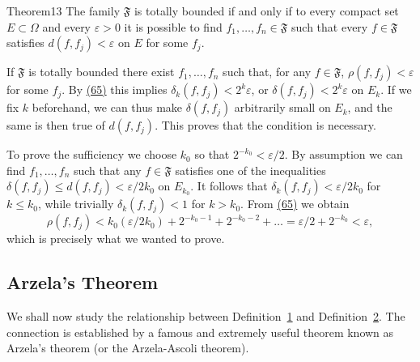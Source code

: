 \begin{originalstatement}{Theorem}{13}\label{thm:5.13}
The family $\mathfrak{F}$ is totally bounded if and only if to every compact set $E\subset\Omega$ and every $\varepsilon>0$ it is possible to find $f_{1},\ldots,f_{n}\in\mathfrak{F}$ such that every $f\in\mathfrak{F}$ satisfies $d(f,f_{j})<\varepsilon$ on $E$ for some $f_{j}$.
\end{originalstatement}
If $\mathfrak{F}$ is totally bounded there exist $f_{1},\ldots ,f_{n}$ such that, for any $f\in \mathfrak{F}$, $\rho (f,f_j) < \varepsilon$ for some $f_{j}$. By \hyperref[eq:5.65]{(65)} this implies $\delta_k(f,f_j) < 2^k\varepsilon$, or $\delta (f,f_j) < 2^k\varepsilon$ on $E_{k}$. If we fix $k$ beforehand, we can thus make $\delta (f,f_j)$ arbitrarily small on $E_{k}$, and the same is then true of $d(f,f_j)$. This proves that the condition is necessary.

To prove the sufficiency we choose $k_0$ so that $2^{-k_0} < \varepsilon / 2$. By assumption we can find $f_1, \ldots, f_n$ such that any $f \in \mathfrak{F}$ satisfies one of the inequalities $\delta(f, f_j) \leq d(f, f_j) < \varepsilon / 2k_0$ on $E_{k_0}$. It follows that $\delta_k(f, f_j) < \varepsilon / 2k_0$ for $k \leq k_0$, while trivially $\delta_k(f, f_j) < 1$ for $k > k_0$. From \hyperref[eq:5.65]{(65)} we obtain
\begin{equation*}
\rho (f, f _ {j}) <   k _ {0} \left(\varepsilon / 2 k _ {0}\right) + 2 ^ {- k _ {0} - 1} + 2 ^ {- k _ {0} - 2} + \dots = \varepsilon / 2 + 2 ^ {- k _ {0}} <   \varepsilon ,
\end{equation*}
which is precisely what we wanted to prove.

\setcounter{section}{5}\setcounter{subsection}{2}\subsection{Arzela's Theorem}\label{sec:5.5.3}
We shall now study the relationship between Definition~\hyperref[def:5.1]{1} and Definition~\hyperref[def:5.2]{2}. The connection is established by a famous and extremely useful theorem known as Arzela's theorem (or the Arzela-Ascoli theorem).


